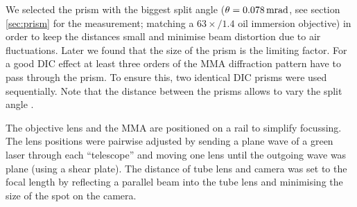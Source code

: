 We selected the prism with the biggest split angle
($\theta=\unit[0.078]{mrad}$, see section \ref{sec:prism} for the
measurement; matching a $63\times/1.4$ oil immersion objective) in
order to keep the distances small and minimise beam distortion due to
air fluctuations. Later we found that the size of the prism is the
limiting factor. For a good DIC effect at least three orders of the
MMA diffraction pattern have to pass through the prism. To ensure
this, two identical DIC prisms were used sequentially. Note that the
distance between the prisms allows to vary the split angle
\citep{Schwertner2008}.

The objective lens and the MMA are positioned on a rail to simplify
focussing. The lens positions were pairwise adjusted by sending a
plane wave of a green laser through each ``telescope'' and moving one
lens until the outgoing wave was plane (using a shear plate). The
distance of tube lens and camera was set to the focal length by
reflecting a parallel beam into the tube lens and minimising the size
of the spot on the camera.

